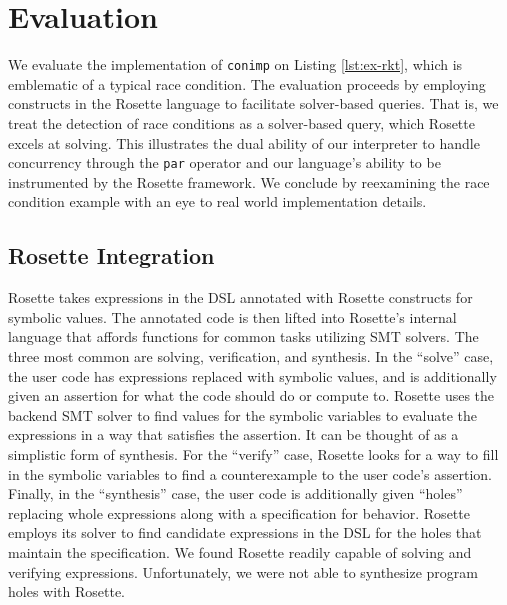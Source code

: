 \section{Evaluation}
We evaluate the implementation of \texttt{conimp} on Listing \ref{lst:ex-rkt}, which is emblematic of a typical race condition.  The evaluation proceeds by employing constructs in the Rosette language to facilitate solver-based queries.  That is, we treat the detection of race conditions as a solver-based query, which Rosette excels at solving.  This illustrates the dual ability of our interpreter to handle concurrency through the \texttt{par} operator and our language's ability to be instrumented by the Rosette framework.  We conclude by reexamining the race condition example with an eye to real world implementation details.  

\subsection{Rosette Integration}
Rosette takes expressions in the DSL annotated with Rosette constructs for symbolic values.  The annotated code is then lifted into Rosette's internal language that affords functions for common tasks utilizing SMT solvers.  The three most common are solving, verification, and synthesis.  In the ``solve'' case, the user code has expressions replaced with symbolic values, and is additionally given an assertion for what the code should do or compute to. Rosette uses the backend SMT solver to find values for the symbolic variables to evaluate the expressions in a way that satisfies the assertion.  It can be thought of as a simplistic form of synthesis.  For the ``verify'' case, Rosette looks for a way to fill in the symbolic variables to find a counterexample to the user code's assertion. Finally, in the ``synthesis'' case, the user code is additionally given ``holes'' replacing whole expressions along with a specification for behavior.  Rosette employs its solver to find candidate expressions in the DSL for the holes that maintain the specification.  We found Rosette readily capable of solving and verifying expressions.  Unfortunately, we were not able to synthesize program holes with Rosette.

